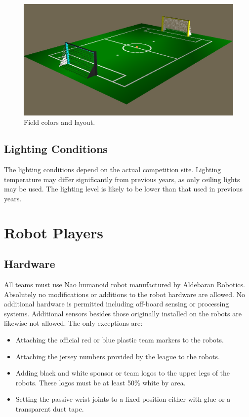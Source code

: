 \documentclass[12pt]{article}
\begin{document}
\begin{figure}[t]
\centerline{\includegraphics[width=\columnwidth]{figs/Nao2009Field-View.png}}
\caption{Field colors and layout.}
\label{fig:field_color}
\end{figure}


\subsection{Lighting Conditions}
The lighting conditions depend on the actual competition site.
Lighting temperature may differ significantly from previous years, as
only ceiling lights may be used. The lighting level is likely to be lower than that used in previous years.

\section{Robot Players}

\subsection{Hardware}

All teams must use Nao humanoid robot manufactured by Aldebaran Robotics. Absolutely no
modifications or additions to the robot hardware are allowed. No
additional hardware is permitted including off-board sensing or
processing systems. Additional sensors besides those originally
installed on the robots are likewise not allowed. The only
exceptions are:

\begin{itemize}
\item Attaching the official red or blue plastic team markers to the robots.
\item Attaching the jersey numbers provided by the league to the robots.
\item Adding black and white sponsor or team logos to the upper legs of the
robots. These logos must be at least 50\% white by area.
\item Setting the passive wrist joints to a fixed position either with glue or a transparent duct tape.
\end{itemize}
\end{document}
